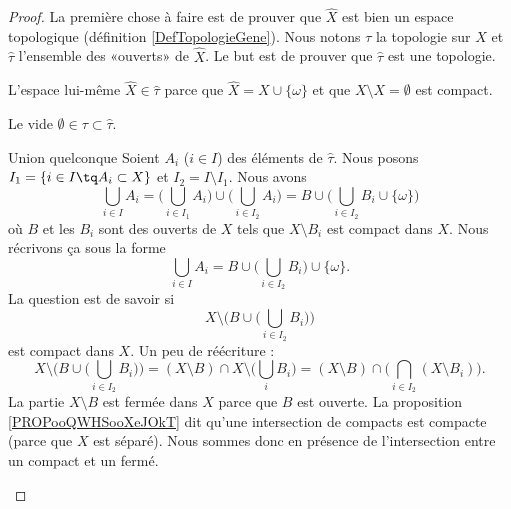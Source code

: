\begin{proof}
    La première chose à faire est de prouver que \( \hat X\) est bien un espace topologique (définition \ref{DefTopologieGene}). Nous notons \( \tau\) la topologie sur \( X\) et \( \hat\tau\) l'ensemble des «ouverts» de \( \hat X\). Le but est de prouver que \( \hat \tau\) est une topologie.
    \begin{subproof}
    \item[L'espace lui-même]
            \( \hat X\in \hat\tau\) parce que \( \hat X=X\cup \{ \omega \}\) et que \( X\setminus X=\emptyset\) est compact.
        \item[Le vide]
            \( \emptyset\in \tau\subset \hat \tau\).
        \item[Union quelconque]
            Soient \( A_i\) (\( i\in I\)) des éléments de \( \hat\tau\). Nous posons \( I_1=\{ i\in I\tq A_i\subset X \}\) et \( I_2=I\setminus I_1\). Nous avons
            \begin{equation}
                \bigcup_{i\in I}A_i=\big( \bigcup_{i\in I_1}A_i \big)\cup \big( \bigcup_{i\in I_2}A_i \big)=B\cup\big( \bigcup_{i\in I_2}B_i\cup\{ \omega \} \big)
            \end{equation}
            où \( B\) et les \( B_i\) sont des ouverts de \( X\) tels que \( X\setminus B_i\) est compact dans \( X\). Nous récrivons ça sous la forme
            \begin{equation}
                \bigcup_{i\in I}A_i=B\cup\big( \bigcup_{i\in I_2}B_i \big)\cup\{ \omega \}.
            \end{equation}
            La question est de savoir si
            \begin{equation}
                X\setminus\Big( B\cup\big( \bigcup_{i\in I_2}B_i \big) \Big)
            \end{equation}
            est compact dans \( X\). Un peu de réécriture :
            \begin{equation}
                X\setminus\Big( B\cup\big( \bigcup_{i\in I_2}B_i \big) \Big)=(X\setminus B)\cap X\setminus\big( \bigcup_iB_i \big)=(X\setminus B)\cap\big( \bigcap_{i\in I_2}(X\setminus B_i) \big).
            \end{equation}
            La partie \( X\setminus B\) est fermée dans \( X\) parce que \( B\) est ouverte. La proposition \ref{PROPooQWHSooXeJOkT} dit qu'une intersection de compacts est compacte (parce que \( X\) est séparé). Nous sommes donc en présence de l'intersection entre un compact et un fermé.


\end{subproof}
\end{proof}
